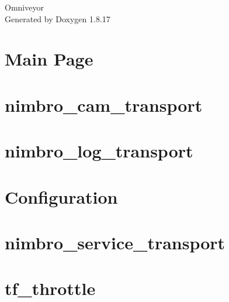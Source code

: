 \let\mypdfximage\pdfximage\def\pdfximage{\immediate\mypdfximage}\documentclass[twoside]{book}
\newcommand{\+}{\discretionary{\mbox{\scriptsize$\hookleftarrow$}}{}{}}
\newcommand{\clearemptydoublepage}{%
  \newpage{\pagestyle{empty}\cleardoublepage}%
}
\begin{document}
\hypersetup{pageanchor=false,
             bookmarksnumbered=true,
             pdfencoding=unicode
            }
\begin{titlepage}
\vspace*{7cm}
\begin{center}%
{\Large Omniveyor }\\
\vspace*{1cm}
{\large Generated by Doxygen 1.8.17}\\
\end{center}
\end{titlepage}
\clearemptydoublepage
{}
\tableofcontents
\clearemptydoublepage
{}
\hypersetup{pageanchor=true}

\chapter{Main Page}
\label{index}\hypertarget{index}{}
\chapter{nimbro\+\_\+cam\+\_\+transport}
\label{md_nimbro_network_nimbro_cam_transport_README}

\chapter{nimbro\+\_\+log\+\_\+transport}
\label{md_nimbro_network_nimbro_log_transport_README}

\chapter{Configuration}
\label{md_nimbro_network_nimbro_service_transport_doc_configuration}

\chapter{nimbro\+\_\+service\+\_\+transport}
\label{md_nimbro_network_nimbro_service_transport_README}

\chapter{tf\+\_\+throttle}
\label{md_nimbro_network_nimbro_tf_throttle_README}

\end{document}
